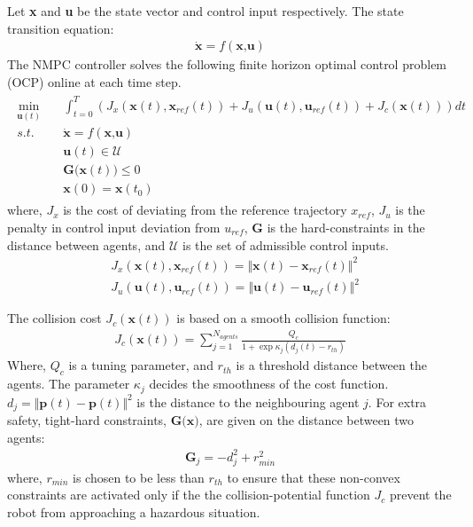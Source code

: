Let \textbf{x} and \textbf{u} be the state vector and control input respectively. The state transition equation:
\begin{align}
\dot{\textbf{x}}=f(\textbf{x,u})
\end{align}
The NMPC controller solves the following finite horizon optimal control problem (OCP) online at each time step.
\begin{align}
\begin{split}
\min_{\textbf{u}(t)}\quad &\int_{t=0}^{T} \left(J_x(\textbf{x}(t),\textbf{x}_{ref}(t))+J_u(\textbf{u}(t),\textbf{u}_{ref}(t))+J_c(\textbf{x}(t))\right) dt\\
s.t.\quad & \dot{\textbf{x}}=f(\textbf{x,u})\\
&\textbf{u}(t)\in \mathcal{U}\\
&\textbf{G(x}(t)) \leq 0 \\
&\textbf{x}(0)=\textbf{x}(t_0)
\end{split}
\end{align}
where, $J_x$ is the cost of deviating from the reference trajectory $x_{ref}$, $J_u$ is the penalty in control input deviation from $u_{ref}$,  \textbf{G} is the hard-constraints in the distance between agents, and $\mathcal{U}$ is the set of admissible control inputs.
\begin{align}
&J_x(\textbf{x}(t), \textbf{x}_{ref}(t)) = \Vert \textbf{x}(t)-\textbf{x}_{ref}(t)\Vert ^2\\
&J_u(\textbf{u}(t), \textbf{u}_{ref}(t)) = \Vert \textbf{u}(t)-\textbf{u}_{ref}(t)\Vert ^2
\end{align}

The collision cost $J_c(\textbf{x}(t))$ is based on a smooth collision function:
\begin{align}
J_c(\textbf{x}(t))=\sum_{j=1}^{N_{agents}}\frac{Q_c}{1+\exp\kappa_j(d_j(t)-r_{th})}
\end{align}
Where, $Q_c$ is a tuning parameter, and $r_{th}$ is a threshold distance between the agents. The parameter $\kappa_j$ decides the smoothness of the cost function. $d_j = \Vert \textbf{p}(t)-\textbf{p}(t)\Vert ^2$ is the distance to the neighbouring agent $j$. For extra safety, tight-hard constraints, $\textbf{G(x)}$, are given on the distance between two agents:
\begin{align}
\textbf{G}_j = -d_j^2+r_{min}^2
\end{align}
where, $r_{min}$ is chosen to be less than $r_{th}$ to ensure that these non-convex constraints are activated only if the the collision-potential function $J_c$ prevent the robot from approaching a hazardous situation.

